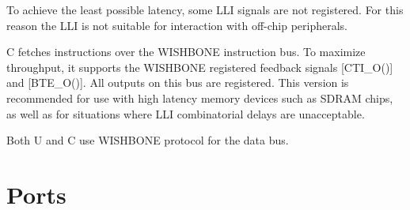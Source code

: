 \documentclass[a4paper,12pt,twoside,extrafontsizes]{memoir}
\begin{document}
To achieve the least possible latency, some LLI signals are not registered. For this reason the LLI is not suitable for interaction with off-chip peripherals.

\lxp{}C fetches instructions over the WISHBONE instruction bus. To maximize throughput, it supports the WISHBONE registered feedback signals [CTI\_O()] and [BTE\_O()]. All outputs on this bus are registered. This version is recommended for use with high latency memory devices such as SDRAM chips, as well as for situations where LLI combinatorial delays are unacceptable.

Both \lxp{}U and \lxp{}C use WISHBONE protocol for the data bus.

\section{Ports}
\end{document}
